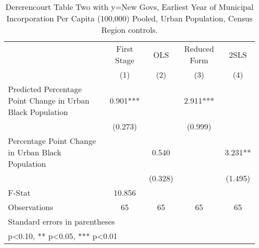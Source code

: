\begin{table}[htbp]\centering
\def\sym#1{\ifmmode^{#1}\else\(^{#1}\)\fi}
\caption{Dererencourt Table Two with y=New Govs, Earliest Year of Municipal Incorporation Per Capita (100,000) Pooled, Urban Population, Census Region controls.}
\begin{tabular}{l*{4}{c}}
\toprule
                    & First Stage   &         OLS   &Reduced Form   &        2SLS   \\
                    &\multicolumn{1}{c}{(1)}   &\multicolumn{1}{c}{(2)}   &\multicolumn{1}{c}{(3)}   &\multicolumn{1}{c}{(4)}   \\
\midrule
Predicted Percentage Point Change in Urban Black Population&       0.901***&               &       2.911***&               \\
                    &     (0.273)   &               &     (0.999)   &               \\
\addlinespace
Percentage Point Change in Urban Black Population&               &       0.540   &               &       3.231** \\
                    &               &     (0.328)   &               &     (1.495)   \\
\midrule
F-Stat              &      10.856   &               &               &               \\
Observations        &          65   &          65   &          65   &          65   \\
\bottomrule
\multicolumn{5}{l}{\footnotesize Standard errors in parentheses}\\
\multicolumn{5}{l}{\footnotesize * p<0.10, ** p<0.05, *** p<0.01}\\
\end{tabular}
\end{table}
